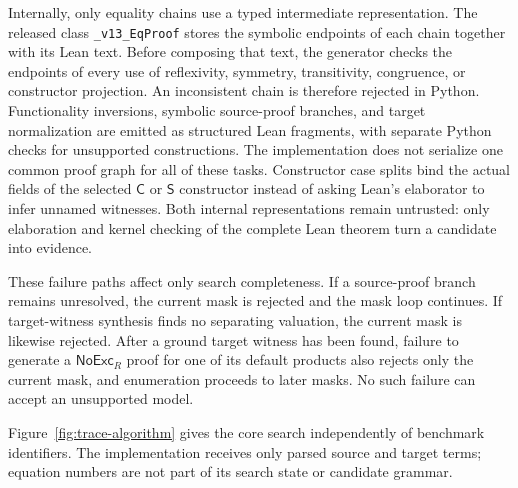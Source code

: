 \documentclass[runningheads]{llncs}
\newcommand{\Code}{\mathsf{C}}
\newcommand{\Step}{\mathsf{S}}
\newcommand{\NoExc}{\mathsf{NoExc}}
\begin{document}
Internally, only equality chains use a typed intermediate representation.  The
released class \texttt{\_v13\_EqProof} stores the symbolic endpoints of each
chain together with its Lean text.  Before composing that text, the generator
checks the endpoints of every use of reflexivity, symmetry, transitivity,
congruence, or constructor projection.  An inconsistent chain is therefore
rejected in Python.  Functionality inversions, symbolic source-proof branches,
and target normalization are emitted as structured Lean fragments, with
separate Python checks for unsupported constructions.  The implementation does
not serialize one common proof graph for all of these tasks.  Constructor case
splits bind the actual fields of the selected $\Code$ or $\Step$ constructor
instead of asking Lean's elaborator to infer unnamed witnesses.  Both internal
representations remain untrusted: only elaboration and kernel checking of the
complete Lean theorem turn a candidate into evidence.

These failure paths affect only search completeness.  If a source-proof
branch remains unresolved, the current mask is rejected and the mask loop
continues.  If target-witness synthesis finds no separating valuation, the
current mask is likewise rejected.  After a ground target witness has been
found, failure to generate a $\NoExc_R$ proof for one of its default products
also rejects only the current mask, and enumeration proceeds to later masks.
No such failure can accept an unsupported model.

Figure~\ref{fig:trace-algorithm} gives the core search independently of
benchmark identifiers.  The implementation receives only parsed source and
target terms; equation numbers are not part of its search state or candidate
grammar.
\end{document}
